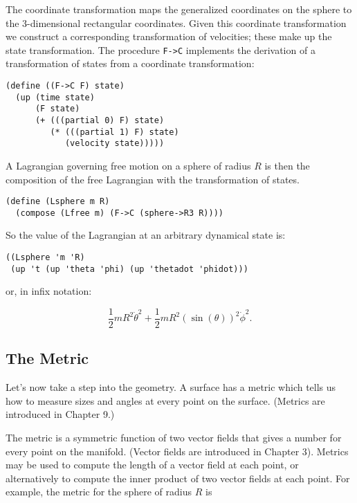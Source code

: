 \documentclass[11pt]{article}
\begin{document}
The coordinate transformation maps the generalized coordinates on the sphere to
the 3-dimensional rectangular coordinates. Given this coordinate transformation
we construct a corresponding transformation of velocities; these make up the
state transformation. The procedure \texttt{F->C} implements the derivation of a
transformation of states from a coordinate transformation:

\begin{verbatim}
(define ((F->C F) state)
  (up (time state)
      (F state)
      (+ (((partial 0) F) state)
         (* (((partial 1) F) state)
            (velocity state)))))
\end{verbatim}

A Lagrangian governing free motion on a sphere of radius \(R\) is then the
composition of the free Lagrangian with the transformation of states.

\begin{verbatim}
(define (Lsphere m R)
  (compose (Lfree m) (F->C (sphere->R3 R))))
\end{verbatim}

So the value of the Lagrangian at an arbitrary dynamical state is:

\begin{verbatim}
((Lsphere 'm 'R)
 (up 't (up 'theta 'phi) (up 'thetadot 'phidot)))
\end{verbatim}

or, in infix notation:

\begin{equation}
\frac{1}{2} mR^2\dot{\theta}^2 +
\frac{1}{2}mR^2\left(\sin\left(\theta\right)\right)^2\dot{\phi}^2.
\end{equation}

\subsection{The Metric}
\label{sec:orgb72bba3}

Let's now take a step into the geometry. A surface has a metric which tells us
how to measure sizes and angles at every point on the surface. (Metrics are
introduced in Chapter 9.)

The metric is a symmetric function of two vector fields that gives a number for
every point on the manifold. (Vector fields are introduced in Chapter 3).
Metrics may be used to compute the length of a vector field at each point, or
alternatively to compute the inner product of two vector fields at each point.
For example, the metric for the sphere of radius \(R\) is
\end{document}
